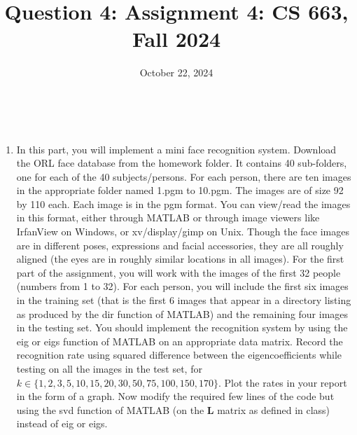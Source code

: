 \documentclass{article}
\title{Question 4: Assignment 4: CS 663, Fall 2024}
\author{
\IEEEauthorblockN{
    \begin{tabular}{cccc}
        \begin{minipage}[t]{0.23\textwidth}
            \centering
            Amitesh Shekhar\\
            IIT Bombay\\
            22b0014@iitb.ac.in
        \end{minipage} & 
        \begin{minipage}[t]{0.23\textwidth}
            \centering
            Anupam Rawat\\
            IIT Bombay\\
            22b3982@iitb.ac.in
        \end{minipage} & 
        \begin{minipage}[t]{0.23\textwidth}
            \centering
            Toshan Achintya Golla\\
            IIT Bombay\\
            22b2234@iitb.ac.in
        \end{minipage} \\
        \\ 
    \end{tabular}
}
}
\date{October 22, 2024}
\begin{document}
\maketitle

\\

\begin{enumerate}
    \item In this part, you will implement a mini face recognition system. Download the ORL face database from the homework folder. It contains 40 sub-folders, one for each of the 40 subjects/persons. For each person, there are ten images in the appropriate folder named 1.pgm to 10.pgm. The images are of size 92 by 110 each. Each image is in the pgm format. You can view/read the images in this format, either through MATLAB or through image viewers like IrfanView on Windows, or xv/display/gimp on Unix. Though the face images are in different poses, expressions and facial accessories, they are all roughly aligned (the eyes are in roughly similar locations in all images). For the first part of the assignment, you will work with the images of the first 32 people (numbers from 1 to 32). For each person, you will include the first six images in the training set (that is the first 6 images that appear in a directory listing as produced by the \textsf{dir} function of MATLAB) and the remaining four images in the testing set. You should implement the recognition system by using the \textsf{eig} or \textsf{eigs} function of MATLAB on an appropriate data matrix. Record the recognition rate using squared difference between the eigencoefficients while testing on all the images in the test set, for $k \in \{1,2,3,5,10,15,20,30,50,75,100,150,170\}$. Plot the rates in your report in the form of a graph. Now modify the required few lines of the code but using the \textsf{svd} function of MATLAB (on the $\boldsymbol{L}$ matrix as defined in class) instead of \textsf{eig} or \textsf{eigs}. \\
    

\end{enumerate}
\end{document}
